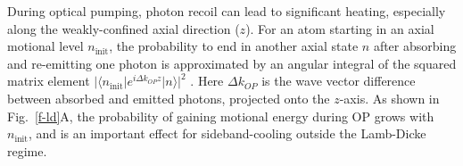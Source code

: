 \documentclass[aps,prl,twocolumn,groupedaddress]{revtex4-1}
\begin{document}


During optical pumping, photon recoil can lead to significant heating, especially along the weakly-confined axial direction ($z$).  For an atom starting in an axial motional level $n_{\textrm{init}}$, the probability to end in another axial state $n$ after absorbing and re-emitting one photon is approximated by an angular integral of the squared matrix element $|\langle n_{\textrm{init}}|e^{i \Delta k_{OP} z}| n\rangle|^2$ \cite{ItanoWineland1979}. Here $\Delta k_{OP}$ is the wave vector difference between absorbed and emitted photons, projected onto the $z$-axis.  As shown in Fig.~\ref{f-ld}A, the probability of gaining motional energy during OP grows with $n_{\textrm{init}}$, and is an important effect for sideband-cooling outside the Lamb-Dicke regime.
\end{document}
